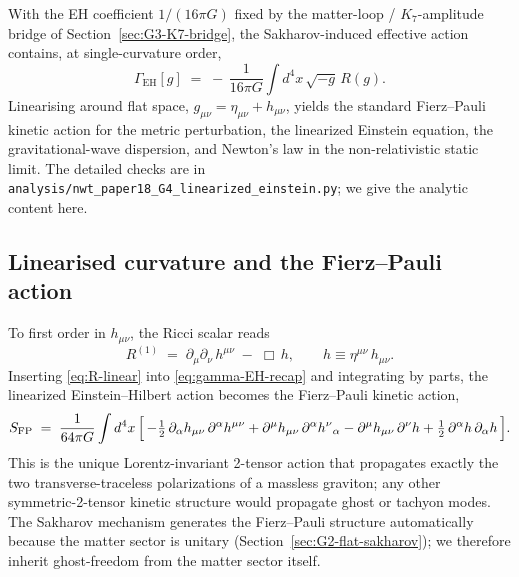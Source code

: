 \documentclass[11pt]{article}
\begin{document}
With the EH coefficient $1/(16\pi G)$ fixed by the
matter-loop / $K_7$-amplitude bridge of
Section~\ref{sec:G3-K7-bridge}, the Sakharov-induced effective
action contains, at single-curvature order,
\begin{equation}
  \Gamma_{\mathrm{EH}}[g]
   \;=\;
   -\,\frac{1}{16\pi G}\int d^4x\,\sqrt{-g}\,R(g).
  \label{eq:gamma-EH-recap}
\end{equation}
Linearising around flat space, $g_{\mu\nu} = \eta_{\mu\nu} +
h_{\mu\nu}$, yields the standard Fierz--Pauli kinetic action for
the metric perturbation, the linearized Einstein equation, the
gravitational-wave dispersion, and Newton's law in the
non-relativistic static limit.  The detailed checks are in
\texttt{analysis/}\allowbreak\texttt{nwt\_\allowbreak paper18\_\allowbreak G4\_\allowbreak linearized\_\allowbreak einstein.py};
we give the analytic content here.

\subsection{Linearised curvature and the Fierz--Pauli action}

To first order in $h_{\mu\nu}$, the Ricci scalar reads
\begin{equation}
  R^{(1)}
   \;=\;
   \partial_\mu\partial_\nu\,h^{\mu\nu}
   \;-\;
   \Box\,h,
   \qquad
   h \equiv \eta^{\mu\nu}\,h_{\mu\nu}.
  \label{eq:R-linear}
\end{equation}
Inserting \eqref{eq:R-linear} into \eqref{eq:gamma-EH-recap} and
integrating by parts, the linearized Einstein--Hilbert action
becomes the Fierz--Pauli kinetic action,
\begin{equation}
  S_{\mathrm{FP}}
   \;=\;
   \frac{1}{64\pi G}
   \int d^4 x\,\Bigl[\,
     -\tfrac{1}{2}\,\partial_\alpha h_{\mu\nu}\,\partial^\alpha h^{\mu\nu}
     + \partial^\mu h_{\mu\nu}\,\partial^\alpha {h^\nu}{}_\alpha
     - \partial^\mu h_{\mu\nu}\,\partial^\nu h
     + \tfrac{1}{2}\,\partial^\alpha h\,\partial_\alpha h
  \,\Bigr].
  \label{eq:Fierz-Pauli}
\end{equation}
This is the unique Lorentz-invariant 2-tensor action that
propagates exactly the two transverse-traceless polarizations of a
massless graviton; any other symmetric-2-tensor kinetic structure
would propagate ghost or tachyon modes.  The Sakharov mechanism
generates the Fierz--Pauli structure automatically because the
matter sector is unitary (Section~\ref{sec:G2-flat-sakharov}); we
therefore inherit ghost-freedom from the matter sector itself.
\end{document}
